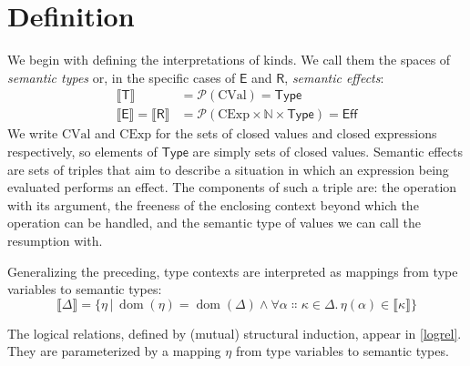 \documentclass[a4paper, 11pt,titlepage, openright, twoside]{report}
\newcommand{\kT}{\mathsf{T}}
\newcommand{\kE}{\mathsf{E}}
\newcommand{\kR}{\mathsf{R}}
\DeclareMathOperator{\dom}{dom}
\newcommand{\+}{\enspace}
\begin{document}
\section{Definition}

We begin with defining the interpretations of kinds.
We call them the spaces of \textit{semantic types} or,
in the specific cases of $\kE$ and $\kR$, \textit{semantic effects}:
\begin{align*}
	⟦\kT⟧ &= \mathcal{P}(\textrm{CVal}) = \mathsf{Type}\\
	⟦\kE⟧ = ⟦\kR⟧ &= \mathcal{P}(\textrm{CExp}×ℕ×\mathsf{Type}) = \mathsf{Eff}
\end{align*}
We write $\textrm{CVal}$ and $\textrm{CExp}$ for the sets of closed values and closed expressions respectively, so
elements of $\mathsf{Type}$ are simply sets of closed values.
Semantic effects are sets of triples that aim to describe a situation
in which an expression being evaluated performs an effect.
The components of such a triple are:
the operation with its argument,
the freeness of the enclosing context beyond which the operation can be handled,
and the semantic type of values we can call the resumption with.

Generalizing the preceding,
type contexts are interpreted as mappings from type variables to semantic types:%
$$⟦Δ⟧ = \{ η │ \dom(η) = \dom(Δ) ∧ ∀α∷κ∈Δ.\,η(α) ∈ ⟦κ⟧ \}$$

The logical relations, defined by (mutual) structural induction, appear in \cref{logrel}.
They are parameterized by a mapping $η$ from type variables to
semantic types.
\end{document}

